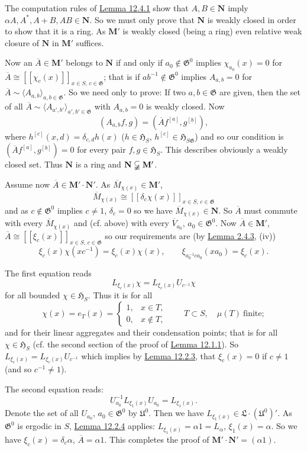 \documentclass[12pt,b5paper,twoside]{article}
\newcommand{\Hspace}{\mathfrak H}
\newcommand{\M}{\mathbf M}
\newcommand{\N}{\mathbf N}
\newcommand{\lemref}[1]{\hyperref[lem:#1]{Lemma #1}}
\begin{document}
The computation rules of \lemref{12.4.1} show that $A,B\in\N$ imply
$\alpha A,A^*,A+B,AB\in\N$. So we must only prove that $\N$ is weakly
closed in order to show that it is a ring. As $\M'$ is weakly closed (being
a ring) even relative weak closure of $\N$ in $\M'$ suffices.

Now an $\overline A\in\M'$ belongs to $\N$ if and only if
$a_0\notin\mathfrak G^0$ implies $\chi_{a_0}(x)=0$ for
$\overline A\cong[[\chi_c(x)]]_{x\in S,\,c\in\mathfrak G}$; that is if
$ab^{-1}\notin\mathfrak G^0$ implies $A_{a,b}=0$ for
$\overline A\sim\langle A_{a,b}\rangle_{a,b\in\mathfrak G}$. So we need
only to prove: If two $a,b\in\mathfrak G$ are given, then the set of all
$\overline A\sim\langle A_{a',b'}\rangle_{a',b'\in\mathfrak G}$ with
$A_{a,b}=0$ is weakly closed. Now
\[
 (A_{a,b}f,g)=(\overline A f^{[a]},g^{[b]}),
\]
where $h^{[c]}(x,d)=\delta_{c,d}h(x)$ ($h\in\Hspace_S$,
$h^{[c]}\in\Hspace_{S\mathfrak G}$) and so our condition is
$(\overline A f^{[a]},g^{[b]})=0$ for every pair $f,g\in\Hspace_S$. This
describes obviously a weakly closed set. Thus $\N$ is a ring and
$\N\varsubsetneqq\M'$.

Assume now $\overline A\in\M'\mathbin{\cdot}\N'$. As
$\overline M_{\chi(x)}\in\M'$,
\[
 \overline M_{\chi(x)}\cong
 [[\delta_c\chi(x)]]_{x\in S,\,c\in\mathfrak G}
\]
and as $c\notin\mathfrak G^0$ implies $c\neq1$, $\delta_c=0$ so we have
$\overline M_{\chi(x)}\in\N$. So $\overline A$ must commute with every
$\overline M_{\chi(x)}$ and (cf. above) with every
$\overline V_{a_0}$, $a_0\in\mathfrak G^0$. Now
$\overline A\in\M'$, $\overline A\cong
[[\xi_c(x)]]_{x\in S,\,c\in\mathfrak G}$ so our requirements are (by
\lemref{2.4.3}, (iv))
\[
 \xi_c(x)\chi(xc^{-1})=\xi_c(x)\chi(x),
 \qquad
 \xi_{a_0^{-1}ca_0}(xa_0)=\xi_c(x).
\]

The first equation reads
\[
 L_{\xi_c(x)}\chi=L_{\xi_c(x)}U_{c^{-1}}\chi
\]
for all bounded $\chi\in\Hspace_S$. Thus it is for all
\[
 \chi(x)=e_T(x)=\begin{cases}
  1,&x\in T,\\
  0,&x\notin T,
 \end{cases}
 \qquad T\subset S,\quad \mu(T)\ \text{finite};
\]
and for their linear aggregates and their condensation points; that is for
all $\chi\in\Hspace_S$ (cf. the second section of the proof of
\lemref{12.1.1}). So
$L_{\xi_c(x)}=L_{\xi_c(x)}U_{c^{-1}}$ which implies by
\lemref{12.2.3}, that $\xi_c(x)=0$ if $c\neq1$ (and so $c^{-1}\neq1$).

The second equation reads:
\[
 U_{a_0}^{-1}L_{\xi_1(x)}U_{a_0}=L_{\xi_1(x)}.
\]
Denote the set of all $U_{a_0}$, $a_0\in\mathfrak G^0$ by $\mathfrak U^0$.
Then we have $L_{\xi_1(x)}\in\mathfrak L\mathbin{\cdot}(\mathfrak U^0)'$.
As $\mathfrak G^0$ is ergodic in $S$, \lemref{12.2.4} applies:
$L_{\xi_1(x)}=\alpha1=L_\alpha$, $\xi_1(x)=\alpha$. So we have
$\xi_c(x)=\delta_c\alpha$, $\overline A=\alpha1$. This completes the proof
of $\M'\mathbin{\cdot}\N'=(\alpha1)$.
\end{document}
